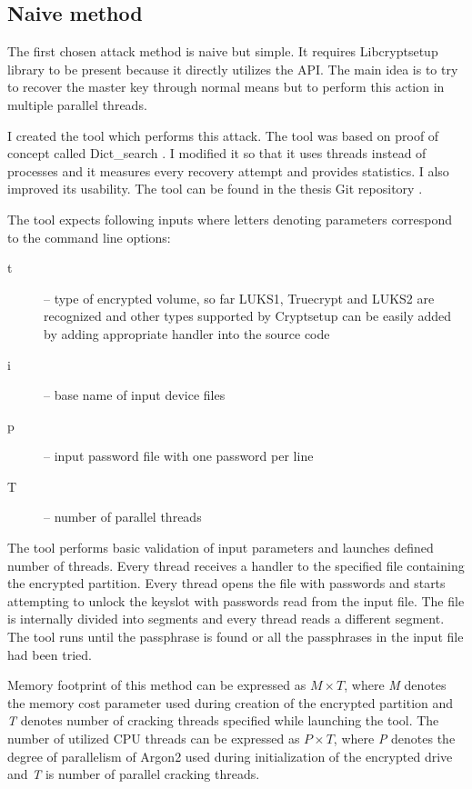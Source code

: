 \documentclass[nolof,digital]{fithesis3}
\begin{document}
\subsection{Naive method}
\label{subsec:naive}
The first chosen attack method is naive but simple. It requires Libcryptsetup library to be present because it directly utilizes the API. The main idea is to try to recover the master key through normal means but to perform this action in multiple parallel threads.

I created the tool which performs this attack. The tool was based on proof of concept called Dict\_search \parencite{cryptsetupdictsearch}.  I modified it so that it uses threads instead of processes and it measures every recovery attempt and provides statistics. I also improved its usability. The tool can be found in the thesis Git repository \parencite{thesisrepo}.

The tool expects following inputs where letters denoting parameters correspond to the command line options:

\begin{description}
\item[t] -- type of encrypted volume, so far LUKS1, Truecrypt and LUKS2 are recognized and other types supported by Cryptsetup can be easily added by adding appropriate handler into the source code

\item[i] -- base name of input device files

\item[p] -- input password file with one password per line

\item[T] -- number of parallel threads
\end{description}

The tool performs basic validation of input parameters and launches defined number of threads. Every thread receives a handler to the specified file containing the encrypted partition. Every thread opens the file with passwords and starts attempting to unlock the keyslot with passwords read from the input file. The file is internally divided into segments and every thread reads a different segment. The tool runs until the passphrase is found or all the passphrases in the input file had been tried.

Memory footprint of this method can be expressed as $M \times T$, where \emph{M} denotes the memory cost parameter used during creation of the encrypted partition and \emph{T} denotes number of cracking threads specified while launching the tool. The number of utilized CPU threads can be expressed as $P \times T$, where \emph{P} denotes the degree of parallelism of Argon2 used during initialization of the encrypted drive and \emph{T} is number of parallel cracking threads.
\end{document}
